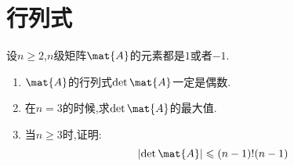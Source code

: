 \documentclass{ctexart}
\begin{document}
\section{行列式}
\begin{problem}
    设$n\geqslant 2$,$n$级矩阵$\mat{A}$的元素都是$1$或者$-1$.
    \begin{enumerate}[label=\tbf{\arabic*}.,topsep=0pt,parsep=0pt,itemsep=0pt,partopsep=0pt]
        \item $\mat{A}$的行列式$\det\mat{A}$一定是偶数.
        \item 在$n=3$的时候,求$\det\mat{A}$的最大值.
        \item 当$n\geqslant 3$时,证明:
            \[\left|\det\mat{A}\right|\leqslant(n-1)!(n-1)\]
    \end{enumerate}
\end{problem}
\end{document}

